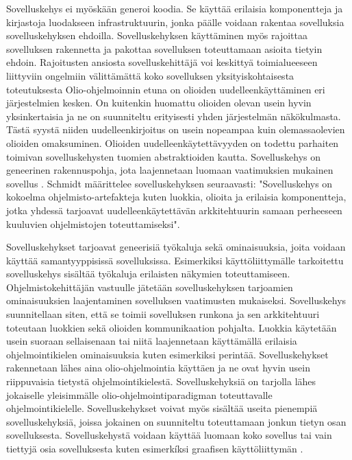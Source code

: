 \documentclass[utf8]{gradu3}
\begin{document}
Sovelluskehys ei myöskään generoi koodia. Se käyttää erilaisia komponentteja ja kirjastoja luodakseen infrastruktuurin, jonka päälle voidaan rakentaa sovelluksia sovelluskehyksen ehdoilla. Sovelluskehyksen käyttäminen myös rajoittaa sovelluksen rakennetta ja pakottaa sovelluksen toteuttamaan asioita tietyin ehdoin. Rajoitusten ansiosta sovelluskehittäjä voi keskittyä toimialueeseen liittyviin ongelmiin välittämättä koko sovelluksen yksityiskohtaisesta toteutuksesta
Olio-ohjelmoinnin etuna on olioiden uudelleenkäyttäminen eri järjestelmien kesken. On kuitenkin huomattu olioiden olevan usein hyvin yksinkertaisia ja ne on suunniteltu erityisesti yhden järjestelmän näkökulmasta. Tästä syystä niiden uudelleenkirjoitus on usein nopeampaa kuin olemassaolevien olioiden omaksuminen. Olioiden uudelleenkäytettävyyden on todettu parhaiten toimivan sovelluskehysten tuomien abstraktioiden kautta. Sovelluskehys on geneerinen rakennuspohja, jota laajennetaan luomaan vaatimuksien mukainen sovellus \parencite[s. 431]{Sommerville}. Schmidt \parencite{frameworks} määrittelee sovelluskehyksen seuraavasti: "Sovelluskehys on kokoelma ohjelmisto-artefakteja kuten luokkia, olioita ja erilaisia komponentteja, jotka yhdessä tarjoavat uudelleenkäytettävän arkkitehtuurin samaan perheeseen kuuluvien ohjelmistojen toteuttamiseksi".

Sovelluskehykset tarjoavat geneerisiä työkaluja sekä ominaisuuksia, joita voidaan käyttää samantyyppisissä sovelluksissa. Esimerkiksi käyttöliittymälle tarkoitettu sovelluskehys sisältää työkaluja erilaisten näkymien toteuttamiseen. Ohjelmistokehittäjän vastuulle jätetään sovelluskehyksen tarjoamien ominaisuuksien laajentaminen sovelluksen vaatimusten mukaiseksi. Sovelluskehys suunnitellaan siten, että se toimii sovelluksen runkona ja sen arkkitehtuuri toteutaan luokkien sekä olioiden kommunikaation pohjalta. Luokkia käytetään usein suoraan sellaisenaan tai niitä laajennetaan käyttämällä erilaisia ohjelmointikielen ominaisuuksia kuten esimerkiksi perintää. Sovelluskehykset rakennetaan lähes aina olio-ohjelmointia käyttäen ja ne ovat hyvin usein riippuvaisia tietystä ohjelmointikielestä. Sovelluskehyksiä on tarjolla lähes jokaiselle yleisimmälle olio-ohjelmointiparadigman toteuttavalle ohjelmointikielelle. Sovelluskehykset voivat myös sisältää useita pienempiä sovelluskehyksiä, joissa jokainen on suunniteltu toteuttamaan jonkun tietyn osan sovelluksesta. Sovelluskehystä voidaan käyttää luomaan koko sovellus tai vain tiettyjä osia sovelluksesta kuten esimerkíksi graafisen käyttöliittymän  \parencite[s. 431]{Sommerville}.
\end{document}
